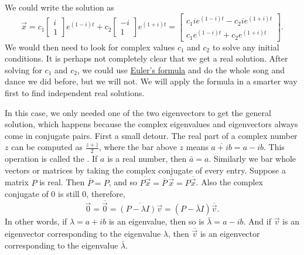 We could write the solution as
\begin{equation*}
\vec{x} =
c_1 \begin{bmatrix} i \\ 1 \end{bmatrix} e^{(1-i)t} +
c_2 \begin{bmatrix} -i \\ 1 \end{bmatrix} e^{(1+i)t}
=
\begin{bmatrix}
c_1 i e^{(1-i)t} - c_2 i e^{(1+i)t} \\
c_1 e^{(1-i)t} + c_2 e^{(1+i)t}
\end{bmatrix} .
\end{equation*}
We would then need to look for complex values $c_1$ and $c_2$ to solve
any initial conditions.  It is perhaps not completely clear
that we get a real solution.  After solving for $c_1$ and $c_2$,
we could use
\hyperref[eulersformula]{Euler's formula} and do the
whole song and dance we did before, but we will not.   We will apply
the formula in a smarter way first to find independent real solutions.

\medskip

In this case, we only needed one of the two eigenvectors to get the general solution, which happens because the complex eigenvalues and eigenvectors always come in conjugate pairs. First a small detour.  The real part of
a complex number $z$ can be computed as $\frac{z + \bar{z}}{2}$, where
the bar above $z$ means $\overline{a+ib} = a -ib$.  This operation is called the
\emph{}.
If $a$ is a real number, then $\bar{a} = a$.
Similarly
we bar whole vectors or matrices by taking the complex conjugate
of every entry.  Suppose a matrix $P$ is real.  Then
$\overline{P} = P$, and so $\overline{P\vec{x}} = \overline{P} \,
\overline{\vec{x}} = P \overline{\vec{x}}$.
Also the complex conjugate of 0 is still 0,
therefore,
\begin{equation*}
\vec{0} = \overline{\vec{0}} = 
\overline{(P-\lambda I)\vec{v}}
=
(P-\bar{\lambda} I)\overline{\vec{v}} .
\end{equation*}
In other words, if $\lambda = a+ib$ is an eigenvalue, then so is $\bar{\lambda} = a-ib$.
And if $\vec{v}$ is an eigenvector corresponding to the eigenvalue
$\lambda$, then $\overline{\vec{v}}$ is an eigenvector corresponding
to the eigenvalue $\bar{\lambda}$.  

